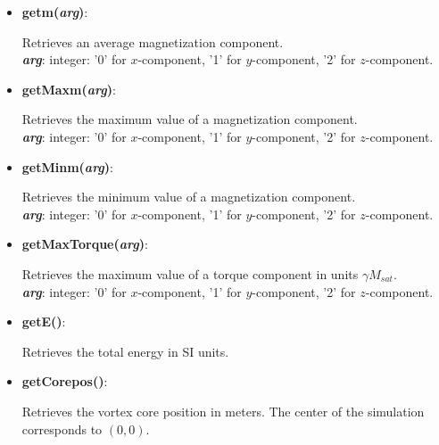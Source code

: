 \begin{itemize}

 \item {\textbf{getm(\textit{arg})}:
				\flushright\parbox{0.9 \textwidth}{\vspace{-0.25cm} 
				Retrieves an average magnetization component.\\
				\textbf{\textit{arg}}: integer: '0' for $x$-component, '1' for $y$-component, '2' for $z$-component.
				}\flushleft}

 \item {\vspace{-0.4cm}\textbf{getMaxm(\textit{arg})}:
				\flushright\parbox{0.9 \textwidth}{\vspace{-0.25cm} 
				Retrieves the maximum value of a magnetization component.\\
				\textbf{\textit{arg}}: integer: '0' for $x$-component, '1' for $y$-component, '2' for $z$-component.
				}\flushleft}

 \item {\vspace{-0.4cm}\textbf{getMinm(\textit{arg})}:
				\flushright\parbox{0.9 \textwidth}{\vspace{-0.25cm} 
				Retrieves the minimum value of a magnetization component.\\
				\textbf{\textit{arg}}: integer: '0' for $x$-component, '1' for $y$-component, '2' for $z$-component.
				}\flushleft}

 \item {\vspace{-0.4cm}\textbf{getMaxTorque(\textit{arg})}:
				\flushright\parbox{0.9 \textwidth}{\vspace{-0.25cm} 
				Retrieves the maximum value of a torque component in units $\gamma M_{sat}$.\\
				\textbf{\textit{arg}}: integer: '0' for $x$-component, '1' for $y$-component, '2' for $z$-component.
				}\flushleft}

 \item {\vspace{-0.4cm}\textbf{getE()}:
				\flushright\parbox{0.9 \textwidth}{\vspace{-0.25cm} 
				Retrieves the total energy in SI units.
				}\flushleft}

 \item {\vspace{-0.4cm}\textbf{getCorepos(\textit{})}:
				\flushright\parbox{0.9 \textwidth}{\vspace{-0.25cm} 
				Retrieves the vortex core position in meters.  The center of the simulation corresponds to $(0,0)$.
				}\flushleft}

\end{itemize}

